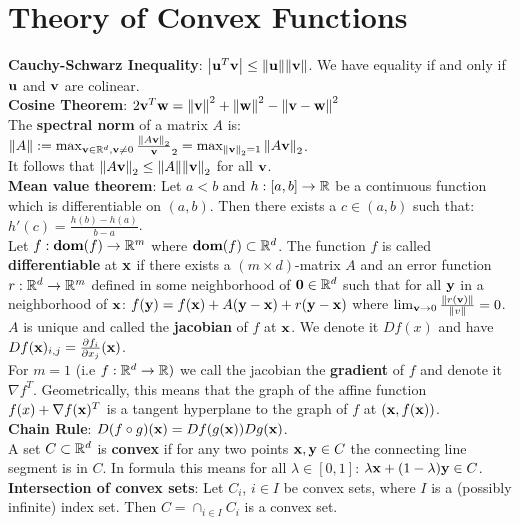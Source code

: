 \section{Theory of Convex Functions}
\textbf{Cauchy-Schwarz Inequality}: $\abs{\mathbf{u}^T \mathbf{v}} \leq \norm{\mathbf{u}} \norm{\mathbf{v}}$. We have equality if and only if $\mathbf{u}$ and $\mathbf{v}$ are colinear. \\
\textbf{Cosine Theorem}: $2\mathbf{v}^T \mathbf{w} = \norm{\mathbf{v}}^2 + \norm{\mathbf{w}}^2 - \norm{\mathbf{v} - \mathbf{w}}^2$ \\
The \textbf{spectral norm} of a matrix $A$ is: $\norm{A} := \max_{\mathbf{v} \in \mathbb{R}^d, \mathbf{v} \neq 0}{\frac{\norm{A\mathbf{v}}_2}{\mathbf{v}}_2} = \max_{\norm{\mathbf{v}}_2=1}{\norm{A\mathbf{v}}_2}$. \\
It follows that $\norm{A \mathbf{v}}_2 \leq \norm{A} \norm{\mathbf{v}}_2$ for all $\mathbf{v}$. \\
\textbf{Mean value theorem}: Let $a < b$ and $h: [a, b] \rightarrow \mathbb{R}$ be a continuous function which is differentiable on $(a, b)$. Then there exists a $c \in (a, b)$ such that: $h'(c) = \frac{h(b) - h(a)}{b - a}$. \\
Let $f : \textbf{dom}(f) \rightarrow \mathbb{R}^m$ where $\textbf{dom}(f) \subset \mathbb{R}^d$. The function $f$ is called \textbf{differentiable} at $\mathbf{x}$ if there exists a $(m \times d)$-matrix $A$ and an error function $r : \mathbb{R}^d \rightarrow \mathbb{R}^m$ defined in some neighborhood of $\mathbf{0} \in \mathbb{R}^d$ such that for all $\mathbf{y}$ in a neighborhood of $\mathbf{x}$: $f(\mathbf{y}) = f(\mathbf{x}) + A(\mathbf{y} - \mathbf{x}) + r(\mathbf{y} - \mathbf{x})$ where $\lim_{\mathbf{v} \rightarrow 0}{\frac{\norm{r(\mathbf{v})}}{\norm{v}}} = 0$. $A$ is unique and called the \textbf{jacobian} of $f$ at $\mathbf{x}$. We denote it $Df(x)$ and have $D f(\mathbf{x})_{i, j} = \frac{\partial f_i}{\partial x_j}(\mathbf{x})$.\\
For $m=1$ (i.e $f : \mathbb{R}^d \rightarrow \mathbb{R})$ we call the jacobian the \textbf{gradient} of $f$ and denote it $\nabla f^T$. Geometrically, this means that the graph of the affine function $f(x) + \nabla f(\mathbf{x})^T$ is a tangent hyperplane to the graph of $f$ at $(\mathbf{x}, f (\mathbf{x}))$. \\
\textbf{Chain Rule}: $D(f \circ g)(\mathbf{x}) = D f(g(\mathbf{x})) Dg(\mathbf{x})$. \\
A set $C \subset \mathbb{R}^d$ is \textbf{convex} if for any two points $\mathbf{x}, \mathbf{y} \in C$ the connecting line segment is in $C$. In formula this means for all $\lambda \in [0, 1]$: $\lambda \mathbf{x} + (1 - \lambda) \mathbf{y} \in C$. \\
\textbf{Intersection of convex sets}: Let $C_i$, $i \in I$ be convex sets, where $I$ is a (possibly infinite) index set. Then $C = \cap_{i \in I}{C_i}$ is a convex set. 
